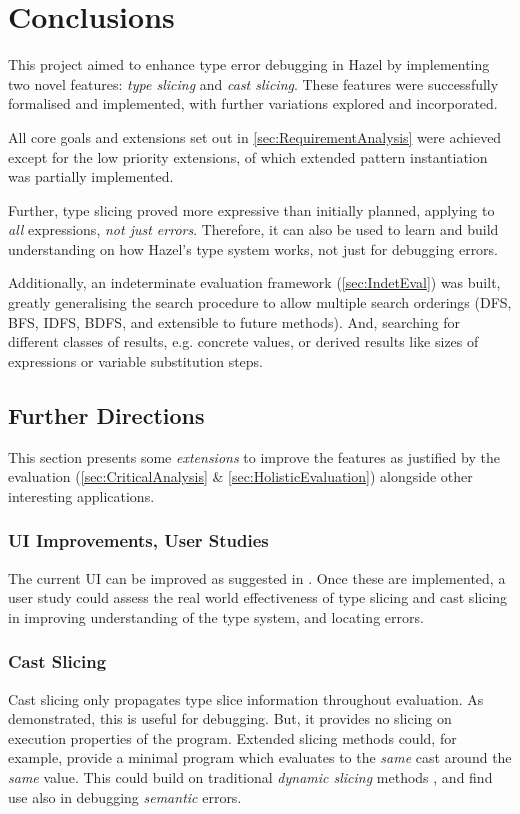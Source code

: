 \chapter{Conclusions}\label{chap:Conclusions}
This project aimed to enhance type error debugging in Hazel by implementing two novel features: \textit{type slicing} and \textit{cast slicing}. These features were successfully formalised and implemented, with further variations explored and incorporated.

All core goals and extensions set out in \cref{sec:RequirementAnalysis} were achieved except for the low priority extensions, of which extended pattern instantiation was partially implemented.

Further, type slicing proved more expressive than initially planned, applying to \textit{all} expressions, \textit{not just errors}. Therefore, it can also be used to learn and build understanding on how Hazel's type system works, not just for debugging errors. 

Additionally, an indeterminate evaluation framework (\cref{sec:IndetEval}) was built, greatly generalising the search procedure to allow multiple search orderings (DFS, BFS, IDFS, BDFS, and extensible to future methods). And, searching for different classes of results, e.g. concrete values, or derived results like sizes of expressions or variable substitution steps.
\section{Further Directions}
This section presents some \textit{extensions} to improve the features as justified by the evaluation (\cref{sec:CriticalAnalysis} \& \ref{sec:HolisticEvaluation}) alongside other interesting {applications}. 

\subsection{UI Improvements, User Studies}
The current UI can be improved as suggested in . Once these are implemented, a user study could assess the real world effectiveness of type slicing and cast slicing in improving understanding of the type system, and locating errors.

\subsection{Cast Slicing}
Cast slicing only propagates type slice information throughout evaluation. As demonstrated, this is useful for debugging. But, it provides no slicing on execution properties of the program. Extended slicing methods could, for example, provide a minimal program which evaluates to the \textit{same} cast around the \textit{same} value. This could build on traditional \textit{dynamic slicing} methods \cite{DynProgSlice, FunctionalProgExplain}, and find use also in debugging \textit{semantic} errors.

